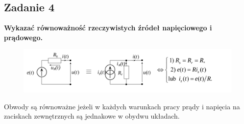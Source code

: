 \documentclass[12pt, a4paper]{article}
\begin{document}
\subsection{Zadanie 4}
\textbf{Wykazać równoważność rzeczywistych źródeł napięciowego i prądowego.}
\begin{figure}[H]
  \centering
  \includegraphics[width = \textwidth]{./images/Lista_1/Zadanie_4.png}
\end{figure}

Obwody są równoważne jeżeli w każdych warunkach pracy prądy i napięcia na zaciskach
zewnętrznych są jednakowe w obydwu układach.
\end{document}
